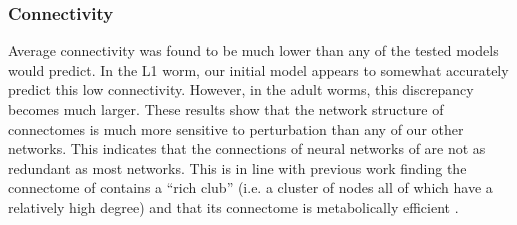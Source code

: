 \subsubsection{Connectivity} Average connectivity was found to be much lower than any of the tested models would predict. 
In the L1 worm, our initial model appears to somewhat accurately predict this low connectivity. 
However, in the adult worms, this discrepancy becomes much larger. 
These results show that the network structure of \ce connectomes is much more sensitive to perturbation than any of our other networks.
This indicates that the connections of neural networks of \ce are not as redundant as most networks. 
This is in line with previous work finding the connectome of \ce contains a ``rich club'' (i.e. a cluster of nodes all of which have a relatively high degree) and that its connectome is metabolically efficient \citep{PerezEscudero, Towlson}.